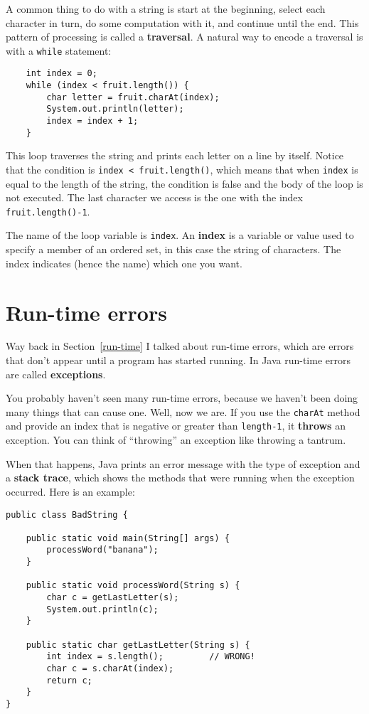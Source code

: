 A common thing to do with a string is
start at the beginning, select each character in turn, do
some computation with it, and continue until the end.  This pattern
of processing is called a {\bf traversal}.  A natural
way to encode a traversal is with a {\tt while} statement:

\begin{lstlisting}
    int index = 0;
    while (index < fruit.length()) {
        char letter = fruit.charAt(index);
        System.out.println(letter);
        index = index + 1;
    }
\end{lstlisting}
%
This loop traverses the string and prints each letter on
a line by itself.  Notice that the condition is
{\tt index < fruit.length()}, which means that when
{\tt index} is equal to the length of the string, the
condition is false and the body of the loop is not executed.
The last character we access is the one with the
index {\tt fruit.length()-1}.


The name of the loop variable is {\tt index}.  An {\bf
index} is a variable or value used to specify a member of an ordered
set, in this case the string of characters.  The index
indicates (hence the name) which one you want.

\section{Run-time errors}
\label{StringIndexOutOfBounds}

Way back in Section~\ref{run-time} I talked about run-time errors,
which are errors that don't appear until a program has started
running.  In Java run-time errors are called {\bf exceptions}.

You probably haven't seen many run-time errors, because we
haven't been doing many things that can cause one.  Well, now we are.
If you use the {\tt charAt} method and provide an index that is
negative or greater than {\tt length-1}, it {\bf throws} an exception.
You can think of ``throwing'' an exception like throwing
a tantrum.

When that happens, Java prints an error message with
the type of exception and a {\bf stack trace}, which shows the methods
that were running when the exception occurred.  Here is an example:

\begin{lstlisting}
public class BadString {

    public static void main(String[] args) {
        processWord("banana");
    }

    public static void processWord(String s) {
        char c = getLastLetter(s);
        System.out.println(c);
    }

    public static char getLastLetter(String s) {
        int index = s.length();         // WRONG!
        char c = s.charAt(index);
        return c;
    }
}
\end{lstlisting}

